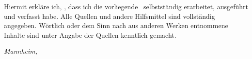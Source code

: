 
\makeatletter

Hiermit erkläre ich, \@author, dass ich die vorliegende \@subject\ selbstständig erarbeitet, ausgeführt und verfasst habe. Alle Quellen und andere Hilfsmittel sind vollständig angegeben. Wörtlich oder dem Sinn nach aus anderen Werken entnommene Inhalte sind unter Angabe der Quellen kenntlich gemacht.

\par\medskip

\noindent
\emph{Mannheim, \@date}

\par\bigskip

\begin{flushright}
\begin{minipage}{5cm}
	\centering
	\hrulefill
	\par\emph{\@author}
\end{minipage}
\end{flushright}

\makeatother